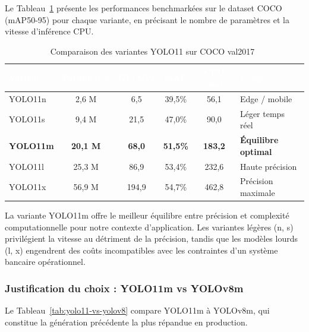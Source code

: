 Le Tableau~\ref{tab:yolo11-variantes} présente les performances benchmarkées sur le dataset COCO (mAP50-95) pour chaque variante, en précisant le nombre de paramètres et la vitesse d'inférence CPU.

\begin{table}[H]
  \centering
  \begin{tabular}{|l|c|c|c|c|l|}
    \toprule
    \rowcolor{bleu_principal}
    \textcolor{white}{\textbf{Variante}} & \textcolor{white}{\textbf{Paramètres}} & \textcolor{white}{\textbf{GFLOPs}} & \textcolor{white}{\textbf{mAP}} & \textcolor{white}{\textbf{CPU (ms)}} & \textcolor{white}{\textbf{Usage}} \\
    \midrule
    YOLO11n & 2,6 M & 6,5 & 39,5\% & 56,1 & Edge / mobile \\
    \midrule
    \rowcolor{gris_leger}
    YOLO11s & 9,4 M & 21,5 & 47,0\% & 90,0 & Léger temps réel \\
    \midrule
    \textbf{YOLO11m} & \textbf{20,1 M} & \textbf{68,0} & \textbf{51,5\%} & \textbf{183,2} & \textbf{Équilibre optimal} \\
    \midrule
    \rowcolor{gris_leger}
    YOLO11l & 25,3 M & 86,9 & 53,4\% & 232,6 & Haute précision \\
    \midrule
    YOLO11x & 56,9 M & 194,9 & 54,7\% & 462,8 & Précision maximale \\
    \bottomrule
  \end{tabular}
  \caption{Comparaison des variantes YOLO11 sur COCO val2017~\cite{ultralytics_docs}}
  \label{tab:yolo11-variantes}
\end{table}

La variante YOLO11m offre le meilleur équilibre entre précision et complexité computationnelle pour notre contexte d'application. Les variantes légères (n, s) privilégient la vitesse au détriment de la précision, tandis que les modèles lourds (l, x) engendrent des coûts incompatibles avec les contraintes d'un système bancaire opérationnel.

\subsubsection{Justification du choix : YOLO11m vs YOLOv8m}

Le Tableau~\ref{tab:yolo11-vs-yolov8} compare YOLO11m à YOLOv8m, qui constitue la génération précédente la plus répandue en production.

